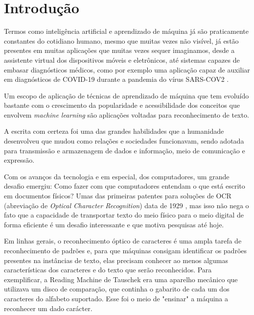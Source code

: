 
\chapter[Introdução]{Introdução}

Termos como inteligência artificial e aprendizado de máquina já são praticamente constantes do cotidiano humano, mesmo que muitas vezes não visível, já estão presentes em muitas aplicações que muitas vezes sequer imaginamos, desde a assistente virtual dos dispositivos móveis e eletrônicos, até sistemas capazes de embasar diagnósticos médicos, como por exemplo uma aplicação capaz de auxiliar em diagnósticos de COVID-19 durante a pandemia do vírus SARS-COV2 \cite{Zhao2021DeepLF}. 

Um escopo de aplicação de técnicas de aprendizado de máquina que tem evoluído bastante com o crescimento da popularidade e acessibilidade dos conceitos que envolvem \textit{machine learning} são aplicações voltadas para reconhecimento de texto.

A escrita com certeza foi uma das grandes habilidades que a humanidade desenvolveu que mudou como relações e sociedades funcionavam, sendo adotada para transmissão e armazenagem de dados e informação, meio de comunicação e expressão.

Com os avanços da tecnologia e em especial, dos computadores, um grande desafio emergiu: Como fazer com que computadores entendam o que está escrito em documentos físicos? Umas das primeiras patentes para soluções de OCR (abreviação de \textit{Optical Character Recognition}) data de 1929 \cite{readingMachine}, mas isso não nega o fato que a capacidade de transportar texto do meio físico para o meio digital de forma eficiente é um desafio interessante e que motiva pesquisas até hoje.

Em linhas gerais, o reconhecimento óptico de caracteres é uma ampla tarefa de reconhecimento de padrões e, para que máquinas consigam identificar os padrões presentes na instâncias de texto, elas precisam conhecer ao menos algumas características dos caracteres e do texto que serão reconhecidos. Para exemplificar, a Reading Machine de Tauschek \cite{readingMachine} era uma aparelho mecânico que utilizava um disco de comparação, que continha o gabarito de cada um dos caracteres do alfabeto suportado. Esse foi o meio de "ensinar" a máquina a reconhecer um dado carácter.


